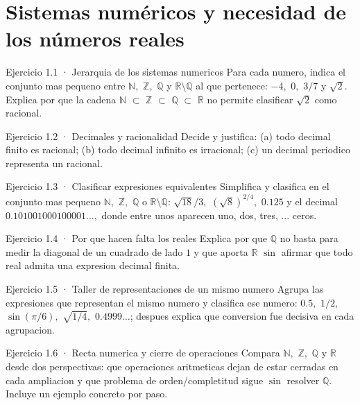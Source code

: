 \documentclass[10pt,a4paper,oneside,openany]{book}
\begin{document}
\section{Sistemas numéricos y necesidad de los números reales}
\begin{PSevenExerciseFixed}{Ejercicio 1.1 · Jerarquia de los sistemas numericos}
Para cada numero, indica el conjunto mas pequeno entre \(\mathbb{N},\) \(\mathbb{Z},\) \(\mathbb{Q}\) y \(\mathbb{R}\setminus \mathbb{Q}\) al que pertenece: \(-4,\) \(0,\) \(3/7\) y \(\sqrt{2}\). Explica por que la cadena \(\mathbb{N}\) \(\subset \) \(\mathbb{Z}\) \(\subset \) \(\mathbb{Q}\) \(\subset \) \(\mathbb{R}\) no permite clasificar \(\sqrt{2}\) como racional.
\end{PSevenExerciseFixed}
\begin{PSevenExerciseFixed}{Ejercicio 1.2 · Decimales y racionalidad}
Decide y justifica: (a) todo decimal finito es racional; (b) todo decimal infinito es irracional; (c) un decimal periodico representa un racional.
\end{PSevenExerciseFixed}
\begin{PSevenExerciseFixed}{Ejercicio 1.3 · Clasificar expresiones equivalentes}
Simplifica y clasifica en el conjunto mas pequeno \(\mathbb{N},\) \(\mathbb{Z},\) \(\mathbb{Q}\) o \(\mathbb{R}\setminus \mathbb{Q}\): \(\sqrt{18}/3,\) \((\sqrt{8})^{2/4},\) \(0.125\) y el decimal \(0.101001000100001\ldots ,\) donde entre unos aparecen uno, dos, tres, ... ceros.
\end{PSevenExerciseFixed}
\begin{PSevenExerciseFixed}{Ejercicio 1.4 · Por que hacen falta los reales}
Explica por que \(\mathbb{Q}\) no basta para medir la diagonal de un cuadrado de lado \(1\) y que aporta \(\mathbb{R}\) \(\sin\) afirmar que todo real admita una expresion decimal finita.
\end{PSevenExerciseFixed}
\begin{PSevenExerciseFixed}{Ejercicio 1.5 · Taller de representaciones de un mismo numero}
Agrupa las expresiones que representan el mismo numero y clasifica ese numero: \(0.5,\) \(1/2,\) \(\sin(\pi /6),\) \(\sqrt{1/4},\) \(0.4999\ldots \); despues explica que conversion fue decisiva en cada agrupacion.
\end{PSevenExerciseFixed}
\begin{PSevenExerciseFixed}{Ejercicio 1.6 · Recta numerica y cierre de operaciones}
Compara \(\mathbb{N},\) \(\mathbb{Z},\) \(\mathbb{Q}\) y \(\mathbb{R}\) desde dos perspectivas: que operaciones aritmeticas dejan de estar cerradas en cada ampliacion y que problema de orden/completitud sigue \(\sin\) resolver \(\mathbb{Q}\). Incluye un ejemplo concreto por paso.
\end{PSevenExerciseFixed}
\end{document}
